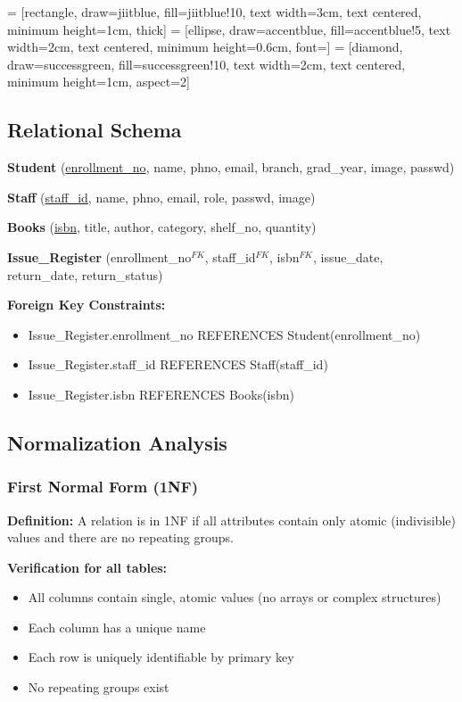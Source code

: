\documentclass[12pt,a4paper]{article}
\begin{document}
 = [rectangle, draw=jiitblue, fill=jiitblue!10,
    text width=3cm, text centered, minimum height=1cm, thick]
 = [ellipse, draw=accentblue, fill=accentblue!5,
    text width=2cm, text centered, minimum height=0.6cm, font=\small]
 = [diamond, draw=successgreen, fill=successgreen!10,
    text width=2cm, text centered, minimum height=1cm, aspect=2]

\subsection{Relational Schema}

\textbf{Student} (\underline{enrollment\_no}, name, phno, email, branch, grad\_year, image, passwd)

\textbf{Staff} (\underline{staff\_id}, name, phno, email, role, passwd, image)

\textbf{Books} (\underline{isbn}, title, author, category, shelf\_no, quantity)

\textbf{Issue\_Register} (enrollment\_no$^{FK}$, staff\_id$^{FK}$, isbn$^{FK}$, issue\_date, return\_date, return\_status)

\vspace{0.3cm}
\textbf{Foreign Key Constraints:}
\begin{itemize}
    \item Issue\_Register.enrollment\_no REFERENCES Student(enrollment\_no)
    \item Issue\_Register.staff\_id REFERENCES Staff(staff\_id)
    \item Issue\_Register.isbn REFERENCES Books(isbn)
\end{itemize}

\subsection{Normalization Analysis}

\subsubsection{First Normal Form (1NF)}

\textbf{Definition:} A relation is in 1NF if all attributes contain only atomic (indivisible) values and there are no repeating groups.

\textbf{Verification for all tables:}
\begin{itemize}
    \item All columns contain single, atomic values (no arrays or complex structures)
    \item Each column has a unique name
    \item Each row is uniquely identifiable by primary key
    \item No repeating groups exist
\end{itemize}
\end{document}

